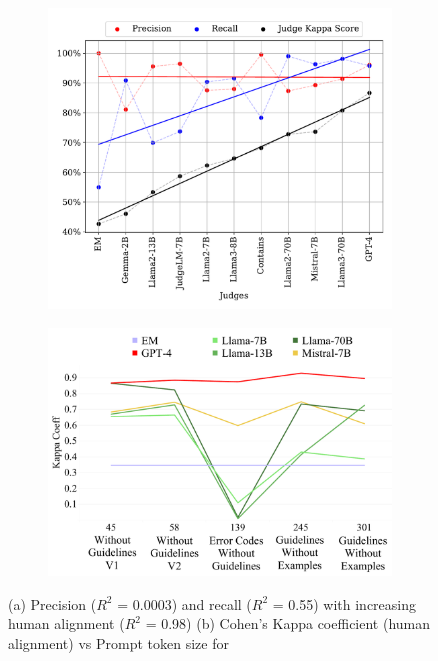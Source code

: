 \begin{figure}[h]
    \begin{subfigure}[b]{0.5\textwidth}
    \centering
        \includegraphics[width=\linewidth]{figures/PrecisionRecall_V5.pdf}
        \caption{}
        \label{fig:precisionrecall}
    \end{subfigure}
    \begin{subfigure}[b]{0.5\textwidth}
    \centering
        \includegraphics[width=\linewidth]{figures/TooMuchInfo.pdf}
        \caption{}
        \label{fig:TooMuchInfo}
    \end{subfigure}
    \caption{(a) Precision (\( R^2 \) = 0.0003) and recall (\( R^2 \) = 0.55) with increasing human alignment (\( R^2 \) = 0.98) (b) Cohen's Kappa coefficient (human alignment) vs Prompt token size for \JudgeModels
    }
\end{figure}

